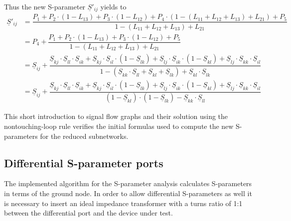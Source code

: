 Thus the new S-parameter $\underline{S}'_{ij}$ yields to
\begin{equation}
\begin{split}
\underline{S}'_{ij}
&= \dfrac{P_{1} + P_{2}\cdot\left(1 - L_{13}\right) + P_{3}\cdot\left(1 - L_{12}\right) + P_{4}\cdot\left(1 - \left(L_{11} + L_{12} + L_{13}\right) + L_{21}\right) + P_{5}}{1 - \left(L_{11} + L_{12} + L_{13}\right) + L_{21}}\\
&= P_{4} + \dfrac{P_{1} + P_{2}\cdot\left(1 - L_{13}\right) + P_{3}\cdot\left(1 - L_{12}\right) + P_{5}}{1 - \left(L_{11} + L_{12} + L_{13}\right) + L_{21}}\\
&= \underline{S}_{ij} + \dfrac{\underline{S}_{kj}\cdot \underline{S}_{ll}\cdot \underline{S}_{ik} + \underline{S}_{kj}\cdot \underline{S}_{il} \cdot\left(1 - \underline{S}_{lk}\right) + \underline{S}_{lj}\cdot \underline{S}_{ik}\cdot\left(1 - \underline{S}_{kl}\right) + \underline{S}_{lj}\cdot \underline{S}_{kk}\cdot \underline{S}_{il}}{1 - \left(\underline{S}_{kk}\cdot \underline{S}_{ll} + \underline{S}_{kl} + \underline{S}_{lk}\right) + \underline{S}_{kl}\cdot \underline{S}_{lk}}\\
&= \underline{S}_{ij} + \dfrac{\underline{S}_{kj}\cdot \underline{S}_{ll}\cdot \underline{S}_{ik} + \underline{S}_{kj}\cdot \underline{S}_{il} \cdot\left(1 - \underline{S}_{lk}\right) + \underline{S}_{lj}\cdot \underline{S}_{ik}\cdot\left(1 - \underline{S}_{kl}\right) + \underline{S}_{lj}\cdot \underline{S}_{kk}\cdot \underline{S}_{il}}{\left(1 - \underline{S}_{kl}\right)\cdot \left(1 - \underline{S}_{lk}\right) - \underline{S}_{kk}\cdot \underline{S}_{ll}}
\end{split}
\end{equation}

This short introduction to signal flow graphs and their solution using
the nontouching-loop rule verifies the initial formulas used to
compute the new S-parameters for the reduced subnetworks.


\subsection{Differential S-parameter ports}
\label{sec:diffSParam}

The implemented algorithm for the S-parameter analysis calculates
S-parameters in terms of the ground node.  In order to allow
differential S-parameters as well it is necessary to insert an ideal
impedance transformer with a turns ratio of 1:1 between the
differential port and the device under test.

